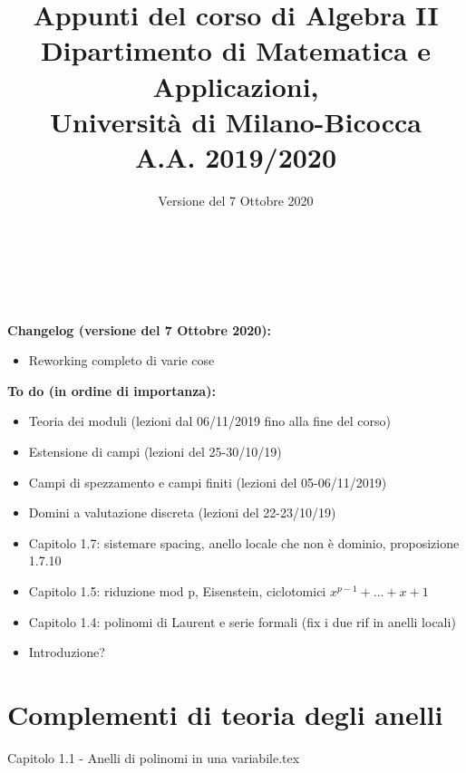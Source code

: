 \documentclass{article}
\begin{document}
\AddToShipoutPicture*{\BackgroundPic}

\title{\Huge{\textbf{Appunti del corso di Algebra II}} \\ \vspace{3mm}
	   \LARGE{\textbf{Dipartimento di Matematica e Applicazioni,}} \\ 
	   \LARGE{\textbf{Università di Milano-Bicocca}} \\ \vspace{3mm}
	   \Large{\textbf{A.A. 2019/2020}} %
	   }
\author{Versione del 7 Ottobre 2020}
\date{}

\maketitle
\thispagestyle{empty}
\clearpage

\tableofcontents

\

\

\noindent \textbf{Changelog (versione del 7 Ottobre 2020):}
\begin{itemize}
\item Reworking completo di varie cose
\end{itemize}

\noindent \textbf{To do (in ordine di importanza):}
\begin{itemize}
\item Teoria dei moduli (lezioni dal 06/11/2019 fino alla fine del corso)
\item Estensione di campi (lezioni del 25-30/10/19)
\item Campi di spezzamento e campi finiti (lezioni del 05-06/11/2019)
\item Domini a valutazione discreta (lezioni del 22-23/10/19)
\item Capitolo 1.7: sistemare spacing, anello locale che non è dominio, proposizione 1.7.10
\item Capitolo 1.5: riduzione mod p, Eisenstein, ciclotomici $x^{p-1}+...+x+1$
\item Capitolo 1.4: polinomi di Laurent e serie formali (fix i due rif in anelli locali)
\item Introduzione?
\end{itemize}
\clearpage

\section{Complementi di teoria degli anelli}
{Capitolo 1.1 - Anelli di polinomi in una variabile.tex}
\end{document}
